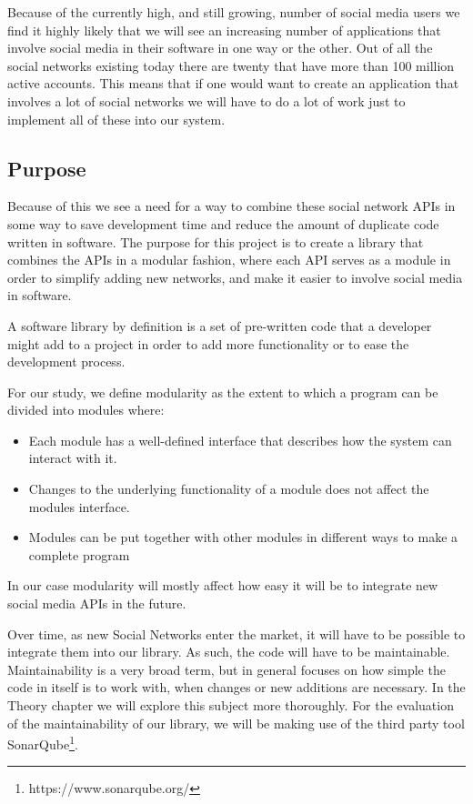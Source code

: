 \documentclass{sigchi-alternate}
\begin{document}
Because of the currently high, and still growing, number of social media users we find it highly likely that we will see an increasing number of
applications that involve social media in their software in one way or the other. Out of all the social networks existing today there are twenty
that have more than 100 million active accounts\autocite{STATISTA_LEADING_SOCIAL_NETWORKS}. This means that if one would want to create an application
that involves a lot of social networks we will have to do a lot of work just to implement all of these into our system.

\subsection{Purpose}
Because of this we see a need for a way to combine these social network APIs in some way to save development
time and reduce the amount of duplicate code written in software. The purpose for this project is to create a library 
that combines the APIs in a modular fashion, where each API serves as a module in order to simplify adding new networks,
and make it easier to involve social media in software. 

A software library by definition is a set of pre-written code that a developer might add to a project in order to add more functionality or to ease the 
development process\autocite{TLDP_LIBRARY_DEFINITION}. 

For our study, we define modularity as the extent to which a program can be divided into modules where\autocite{Kiczales:2005:APM:1062455.1062482}:
\begin{itemize}
	\item Each module has a well-defined interface that describes how the system can interact with it.
	\item Changes to the underlying functionality of a module does not affect the modules interface.
	\item Modules can be put together with other modules in different ways to make a complete program
\end{itemize}
In our case modularity will mostly affect how easy it will be to integrate new social media APIs in the future.

Over time, as new Social Networks enter the market, it will have to be possible to integrate them into our library. As such, the code will have to be maintainable.
Maintainability is a very broad term, but in general focuses on how simple the code in itself is to work with, when changes or new additions are necessary.
In the Theory chapter we will explore this subject more thoroughly. For the evaluation of the maintainability of our library, we will be making use of the third
party tool SonarQube\footnote{https://www.sonarqube.org/}.
\end{document}
